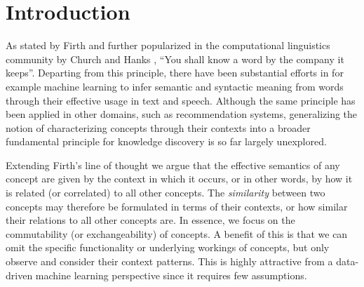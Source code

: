 \documentclass{sig-alternate}
\begin{document}



\section{Introduction}

As stated by Firth \cite{Firth57} and further popularized in the computational linguistics community by Church and
Hanks \cite{Church90}, ``You shall know a word by the company it keeps''. Departing from this principle, there have
been substantial efforts in for example machine learning to infer semantic and syntactic meaning from words through their effective
usage in text and speech. Although the same principle has been applied in other domains, such as recommendation
systems, generalizing the notion of characterizing concepts through their contexts into a broader fundamental principle
for knowledge discovery is so far largely unexplored.

Extending Firth's line of thought we argue that the effective semantics of any concept are given by the context in which
it occurs, or in other words, by how it is related (or correlated) to all other concepts. The \emph{similarity} between
two concepts may therefore be formulated in terms of their contexts, or how similar their relations to all other
concepts are.
In essence, we focus on the commutability (or exchangeability) of concepts.
A benefit of this is that we can omit the specific functionality or underlying workings of concepts, but
only observe and consider their context patterns. This is highly attractive from a data-driven machine learning
perspective since it requires few assumptions.
\end{document}
